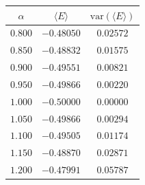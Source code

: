 \begin{tabular}{ccc}
\toprule
$\alpha$ & $\langle E \rangle$ & $\mathrm{var}(\langle E \rangle)$ \\
\midrule
$0.800$ & $-0.48050$ & $0.02572$ \\
$0.850$ & $-0.48832$ & $0.01575$ \\
$0.900$ & $-0.49551$ & $0.00821$ \\
$0.950$ & $-0.49866$ & $0.00220$ \\
$1.000$ & $-0.50000$ & $0.00000$ \\
$1.050$ & $-0.49866$ & $0.00294$ \\
$1.100$ & $-0.49505$ & $0.01174$ \\
$1.150$ & $-0.48870$ & $0.02871$ \\
$1.200$ & $-0.47991$ & $0.05787$ \\
\bottomrule
\end{tabular}
